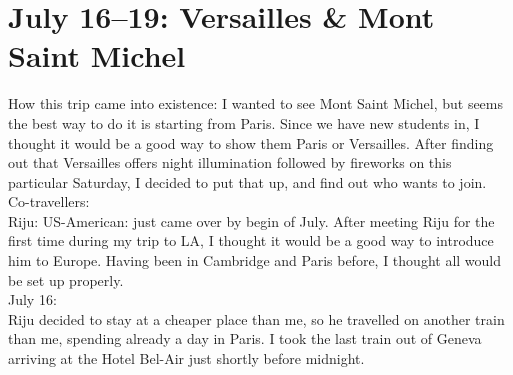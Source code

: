 \section{July 16--19: Versailles \& Mont Saint Michel}
\label{2015:ParisI}

How this trip came into existence: I wanted to see Mont Saint Michel, but seems the best way to do it is starting from Paris. Since we have new students in, I thought it would be a good way to show them Paris or Versailles. After finding out that Versailles offers night illumination followed by fireworks on this particular Saturday, I decided to put that up, and find out who wants to join.\\

Co-travellers:\\
Riju: US-American: just came over by begin of July. After meeting Riju for the first time during my trip to LA, I thought it would be a good way to introduce him to Europe. Having been in Cambridge and Paris before, I thought all would be set up properly. \\

July 16:\\
Riju decided to stay at a cheaper place than me, so he travelled on another train than me, spending already a day in Paris. I took the last train out of Geneva arriving at the Hotel Bel-Air just shortly before midnight.\\

